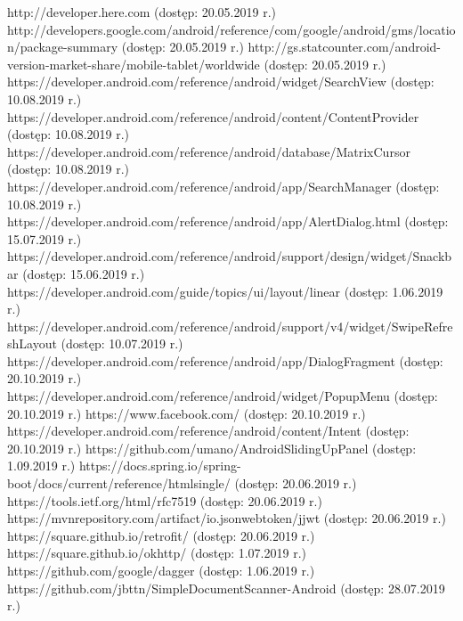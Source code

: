 \documentclass[10pt,twoside,a4paper]{report}
\begin{document}
\begin{thebibliography}{1}
   http://developer.here.com (dostęp: 20.05.2019 r.)
   http://developers.google.com/android/reference/com/google/android/gms/location/package-summary (dostęp: 20.05.2019 r.)
   http://gs.statcounter.com/android-version-market-share/mobile-tablet/worldwide (dostęp: 20.05.2019 r.)
   https://developer.android.com/reference/android/widget/SearchView (dostęp: 10.08.2019 r.)
   https://developer.android.com/reference/android/content/ContentProvider (dostęp: 10.08.2019 r.)
   https://developer.android.com/reference/android/database/MatrixCursor (dostęp: 10.08.2019 r.)
   https://developer.android.com/reference/android/app/SearchManager (dostęp: 10.08.2019 r.)
   https://developer.android.com/reference/android/app/AlertDialog.html (dostęp: 15.07.2019 r.)
   https://developer.android.com/reference/android/support/design/widget/Snackbar (dostęp: 15.06.2019 r.)
   https://developer.android.com/guide/topics/ui/layout/linear (dostęp: 1.06.2019 r.)
   https://developer.android.com/reference/android/support/v4/widget/SwipeRefreshLayout (dostęp: 10.07.2019 r.)
   https://developer.android.com/reference/android/app/DialogFragment (dostęp: 20.10.2019 r.)
   https://developer.android.com/reference/android/widget/PopupMenu
  (dostęp: 20.10.2019 r.)
   https://www.facebook.com/ (dostęp: 20.10.2019 r.)
   https://developer.android.com/reference/android/content/Intent (dostęp: 20.10.2019 r.)
   https://github.com/umano/AndroidSlidingUpPanel (dostęp: 1.09.2019 r.)
   https://docs.spring.io/spring-boot/docs/current/reference/htmlsingle/ (dostęp: 20.06.2019 r.)
   https://tools.ietf.org/html/rfc7519 (dostęp: 20.06.2019 r.)
   https://mvnrepository.com/artifact/io.jsonwebtoken/jjwt (dostęp: 20.06.2019 r.)
   https://square.github.io/retrofit/ (dostęp: 20.06.2019 r.)
   https://square.github.io/okhttp/ (dostęp: 1.07.2019 r.)
   https://github.com/google/dagger (dostęp: 1.06.2019 r.)
   https://github.com/jbttn/SimpleDocumentScanner-Android (dostęp: 28.07.2019 r.)

\end{thebibliography}
\end{document}

